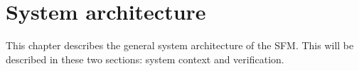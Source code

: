 \chapter{System architecture}
\label{ch:system}
This chapter describes the general system architecture of the SFM. This will be described in these two sections: system context and verification.





%